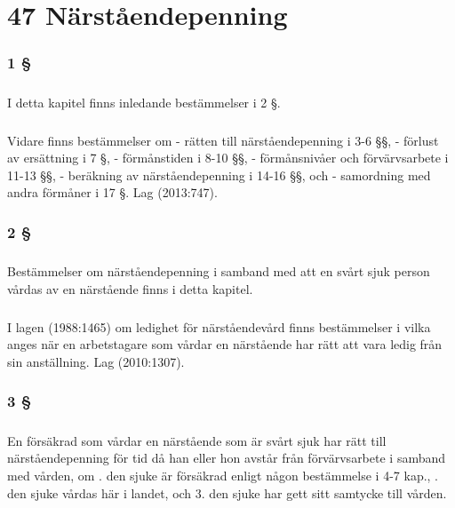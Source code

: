 \documentclass[a4paper,notitlepage,openany,10pt]{book}
\begin{document}
\chapter*{47 Närståendepenning}
\subsection*{1 §}
\paragraph*{}
I detta kapitel finns inledande bestämmelser i 2 §.
\paragraph*{}
Vidare finns bestämmelser om
\newline - rätten till närståendepenning i 3-6 §§,
\newline - förlust av ersättning i 7 §,
\newline - förmånstiden i 8-10 §§,
\newline - förmånsnivåer och förvärvsarbete i 11-13 §§,
\newline - beräkning av närståendepenning i 14-16 §§, och
\newline - samordning med andra förmåner i 17 §.
Lag (2013:747).
\subsection*{2 §}
\paragraph*{}
Bestämmelser om närståendepenning i samband med att en svårt sjuk person vårdas av en närstående finns i detta kapitel.
\paragraph*{}
I lagen (1988:1465) om ledighet för närståendevård finns bestämmelser i vilka anges när en arbetstagare som vårdar en närstående har rätt att vara ledig från sin anställning.
Lag (2010:1307).
\subsection*{3 §}
\paragraph*{}
En försäkrad som vårdar en närstående som är svårt sjuk har rätt till närståendepenning för tid då han eller hon avstår från förvärvsarbete i samband med vården, om
. den sjuke är försäkrad enligt någon bestämmelse i 4-7 kap.,
. den sjuke vårdas här i landet, och 3. den sjuke har gett sitt samtycke till vården.
\end{document}
